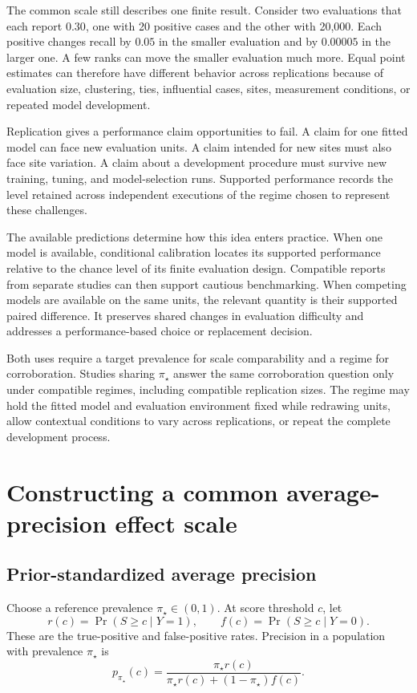\documentclass[11pt]{article}
\theoremstyle{remark}
\begin{document}
The common scale still describes one finite result. Consider two evaluations that each report $0.30$, one with 20 positive cases and the other with 20,000. Each positive changes recall by $0.05$ in the smaller evaluation and by $0.00005$ in the larger one. A few ranks can move the smaller evaluation much more. Equal point estimates can therefore have different behavior across replications because of evaluation size, clustering, ties, influential cases, sites, measurement conditions, or repeated model development.

Replication gives a performance claim opportunities to fail. A claim for one fitted model can face new evaluation units. A claim intended for new sites must also face site variation. A claim about a development procedure must survive new training, tuning, and model-selection runs. Supported performance records the level retained across independent executions of the regime chosen to represent these challenges.

The available predictions determine how this idea enters practice. When one model is available, conditional calibration locates its supported performance relative to the chance level of its finite evaluation design. Compatible reports from separate studies can then support cautious benchmarking. When competing models are available on the same units, the relevant quantity is their supported paired difference. It preserves shared changes in evaluation difficulty and addresses a performance-based choice or replacement decision.

Both uses require a target prevalence for scale comparability and a regime for corroboration. Studies sharing $\pi_\star$ answer the same corroboration question only under compatible regimes, including compatible replication sizes. The regime may hold the fitted model and evaluation environment fixed while redrawing units, allow contextual conditions to vary across replications, or repeat the complete development process.

\section{Constructing a common average-precision effect scale}
\label{sec:common-scale}

\subsection{Prior-standardized average precision}

Choose a reference prevalence $\pi_\star\in(0,1)$. At score threshold $c$, let
\[
r(c)=\Pr(S\geq c\mid Y=1),
\qquad
f(c)=\Pr(S\geq c\mid Y=0).
\]
These are the true-positive and false-positive rates. Precision in a population with prevalence $\pi_\star$ is
\begin{equation}
 p_{\pi_\star}(c)
 =
 \frac{\pi_\star r(c)}
 {\pi_\star r(c)+(1-\pi_\star)f(c)}.
 \label{eq:main-reference-precision}
\end{equation}
\end{document}
